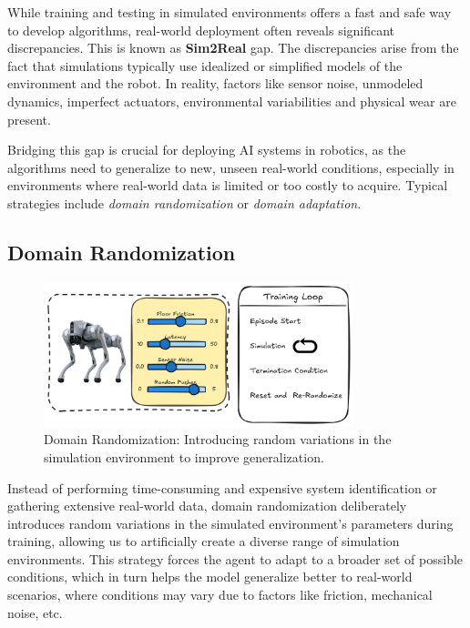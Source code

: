 While training and testing in simulated environments offers a fast and safe way to develop algorithms, real-world deployment often reveals significant discrepancies. This is known as \textbf{Sim2Real} gap. The discrepancies arise from the fact that simulations typically use idealized or simplified models of the environment and the robot. In reality, factors like sensor noise, unmodeled dynamics, imperfect actuators, environmental variabilities and physical wear are present.

Bridging this gap is crucial for deploying AI systems in robotics, as the algorithms need to generalize to new, unseen real-world conditions, especially in environments where real-world data is limited or too costly to acquire. Typical strategies include \textit{domain randomization} or \textit{domain adaptation}.

\subsection{Domain Randomization}
\label{subsec:domain-randomization}

\begin{figure}[h]
	\centering
	\includegraphics[width=0.8\textwidth]{fig/domain-randomization}
	\caption{Domain Randomization: Introducing random variations in the simulation environment to improve generalization.}
	\label{fig:domain-randomization}
\end{figure}

Instead of performing time-consuming and expensive system identification or gathering extensive real-world data, domain randomization deliberately introduces random variations in the simulated environment's parameters during training, allowing us to artificially create a diverse range of simulation environments. This strategy forces the agent to adapt to a broader set of possible conditions, which in turn helps the model generalize better to real-world scenarios, where conditions may vary due to factors like friction, mechanical noise, etc.

